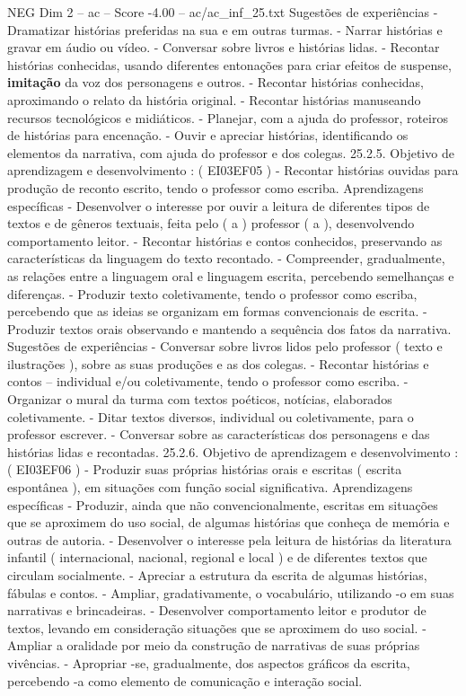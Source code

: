 \begin{textsample}{NEG Dim 2 – ac – Score -4.00 – ac/ac\_inf\_25.txt}
Sugestões de experiências - Dramatizar histórias preferidas na sua e em outras turmas. - Narrar histórias e gravar em áudio ou vídeo. - Conversar sobre livros e histórias lidas. - Recontar histórias conhecidas, usando diferentes entonações para criar efeitos de suspense, \textbf{imitação} da voz dos personagens e outros. - Recontar histórias conhecidas, aproximando o relato da história original. - Recontar histórias manuseando recursos tecnológicos e midiáticos. - Planejar, com a ajuda do professor, roteiros de histórias para encenação. - Ouvir e apreciar histórias, identificando os elementos da narrativa, com ajuda do professor e dos colegas. 25.2.5.
Objetivo de aprendizagem e desenvolvimento : ( EI03EF05 ) - Recontar histórias ouvidas para produção de reconto escrito, tendo o professor como escriba.
Aprendizagens específicas - Desenvolver o interesse por ouvir a leitura de diferentes tipos de textos e de gêneros textuais, feita pelo ( a ) professor ( a ), desenvolvendo comportamento leitor. - Recontar histórias e contos conhecidos, preservando as características da linguagem do texto recontado. - Compreender, gradualmente, as relações entre a linguagem oral e linguagem escrita, percebendo semelhanças e diferenças. - Produzir texto coletivamente, tendo o professor como escriba, percebendo que as ideias se organizam em formas convencionais de escrita. - Produzir textos orais observando e mantendo a sequência dos fatos da narrativa.
Sugestões de experiências - Conversar sobre livros lidos pelo professor ( texto e ilustrações ), sobre as suas produções e as dos colegas. - Recontar histórias e contos – individual e/ou coletivamente, tendo o professor como escriba. - Organizar o mural da turma com textos poéticos, notícias, elaborados coletivamente. - Ditar textos diversos, individual ou coletivamente, para o professor escrever. - Conversar sobre as características dos personagens e das histórias lidas e recontadas. 25.2.6.
Objetivo de aprendizagem e desenvolvimento : ( EI03EF06 ) - Produzir suas próprias histórias orais e escritas ( escrita espontânea ), em situações com função social significativa.
Aprendizagens específicas - Produzir, ainda que não convencionalmente, escritas em situações que se aproximem do uso social, de algumas histórias que conheça de memória e outras de autoria. - Desenvolver o interesse pela leitura de histórias da literatura infantil ( internacional, nacional, regional e local ) e de diferentes textos que circulam socialmente. - Apreciar a estrutura da escrita de algumas histórias, fábulas e contos. - Ampliar, gradativamente, o vocabulário, utilizando -o em suas narrativas e brincadeiras. - Desenvolver comportamento leitor e produtor de textos, levando em consideração situações que se aproximem do uso social. - Ampliar a oralidade por meio da construção de narrativas de suas próprias vivências. - Apropriar -se, gradualmente, dos aspectos gráficos da escrita, percebendo -a como elemento de comunicação e interação social.

\end{textsample}
